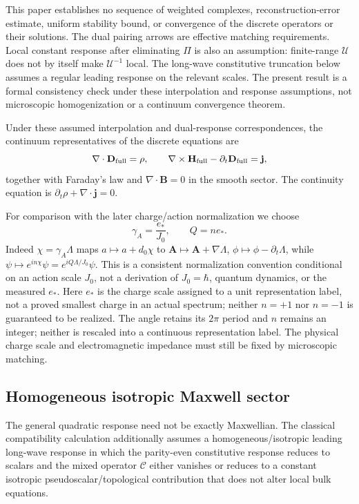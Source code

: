 \documentclass[11pt]{article}
\begin{document}
This paper establishes no sequence of weighted complexes, reconstruction-error estimate, uniform stability bound, or convergence of the discrete operators or their solutions. The dual pairing arrows are effective matching requirements. Local constant response after eliminating $\Pi$ is also an assumption: finite-range $\mathcal U$ does not by itself make $\mathcal U^{-1}$ local. The long-wave constitutive truncation below assumes a regular leading response on the relevant scales. The present result is a formal consistency check under these interpolation and response assumptions, not microscopic homogenization or a continuum convergence theorem.

Under these assumed interpolation and dual-response correspondences, the continuum representatives of the discrete equations are
\begin{equation}
\nabla\cdot\mathbf D_{\rm full}=\rho,\qquad
\nabla\times\mathbf H_{\rm full}-\partial_t\mathbf D_{\rm full}=\mathbf j,
\end{equation}
together with Faraday's law and $\nabla\cdot\mathbf B=0$ in the smooth sector. The continuity equation is $\partial_t\rho+\nabla\cdot\mathbf j=0$.

For comparison with the later charge/action normalization we choose
\begin{equation}
\gamma_A=\frac{e_*}{J_0},\qquad Q=n e_*.
\end{equation}
Indeed $\chi=\gamma_A\Lambda$ maps $a\mapsto a+d_0\chi$ to $\mathbf A\mapsto\mathbf A+\nabla\Lambda$, $\phi\mapsto\phi-\partial_t\Lambda$, while $\psi\mapsto e^{in\chi}\psi=e^{iQ\Lambda/J_0}\psi$. This is a consistent normalization convention conditional on an action scale $J_0$, not a derivation of $J_0=\hbar$, quantum dynamics, or the measured $e_*$. Here $e_*$ is the charge scale assigned to a unit representation label, not a proved smallest charge in an actual spectrum; neither $n=+1$ nor $n=-1$ is guaranteed to be realized. The angle retains its $2\pi$ period and $n$ remains an integer; neither is rescaled into a continuous representation label. The physical charge scale and electromagnetic impedance must still be fixed by microscopic matching.

\subsection{Homogeneous isotropic Maxwell sector}

The general quadratic response need not be exactly Maxwellian. The classical compatibility calculation additionally assumes a homogeneous/isotropic leading long-wave response in which the parity-even constitutive response reduces to scalars and the mixed operator $\mathcal C$ either vanishes or reduces to a constant isotropic pseudoscalar/topological contribution that does not alter local bulk equations.
\end{document}
